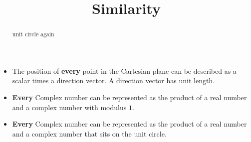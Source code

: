 \documentclass{ximera}
\title{Similarity}
\begin{document}
\begin{abstract}
unit circle again
\end{abstract}
\maketitle



\begin{itemize}
\item The position of \textbf{\textcolor{red!70!black}{every}} point in the Cartesian plane can be described as a scalar times a direction vector.  A direction vector has unit length.

\item \textbf{\textcolor{red!70!black}{Every}} Complex number can be represented as the product of a real number and a complex number with modulus $1$.


\item \textbf{\textcolor{red!70!black}{Every}} Complex number can be represented as the product of a real number and a complex number that sits on the unit circle.
\end{itemize}
\end{document}

